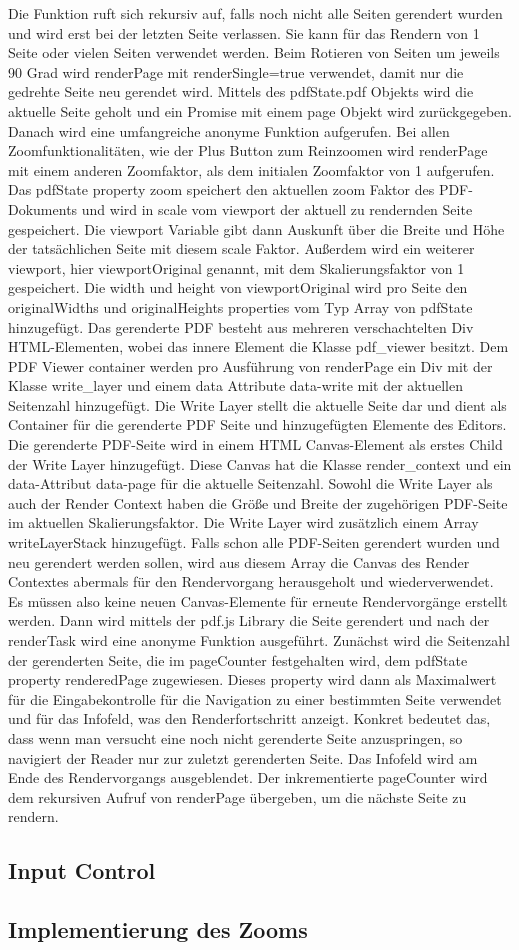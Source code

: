 Die Funktion ruft sich rekursiv auf, falls noch nicht alle Seiten gerendert wurden und wird erst bei der letzten Seite verlassen. Sie kann für das Rendern von 1 Seite oder vielen Seiten verwendet werden. Beim Rotieren von Seiten um jeweils 90 Grad wird renderPage mit renderSingle=true verwendet, damit nur die gedrehte Seite neu gerendet wird. Mittels des pdfState.pdf Objekts wird die aktuelle Seite geholt und ein Promise mit einem page Objekt wird zurückgegeben. Danach wird eine umfangreiche anonyme Funktion aufgerufen. Bei allen Zoomfunktionalitäten, wie der Plus Button zum Reinzoomen wird renderPage mit einem anderen Zoomfaktor, als dem initialen Zoomfaktor von 1 aufgerufen. Das pdfState property zoom speichert den aktuellen zoom Faktor des PDF-Dokuments und wird in scale vom viewport der aktuell zu rendernden Seite gespeichert. Die viewport Variable gibt dann Auskunft über die Breite und Höhe der tatsächlichen Seite mit diesem scale Faktor. Außerdem wird ein weiterer viewport, hier viewportOriginal genannt, mit dem Skalierungsfaktor von 1 gespeichert. Die width und height von viewportOriginal wird pro Seite den originalWidths und originalHeights properties vom Typ Array von pdfState hinzugefügt. Das gerenderte PDF besteht aus mehreren verschachtelten Div HTML-Elementen, wobei das innere Element die Klasse pdf\_viewer besitzt. Dem PDF Viewer container werden pro Ausführung von renderPage ein Div mit der Klasse write\_layer und einem data Attribute data-write mit der aktuellen Seitenzahl hinzugefügt. Die Write Layer stellt die aktuelle Seite dar und dient als Container für die gerenderte PDF Seite und hinzugefügten Elemente des Editors. Die gerenderte PDF-Seite wird in einem HTML Canvas-Element als erstes Child der Write Layer hinzugefügt. Diese Canvas hat die Klasse render\_context und ein data-Attribut data-page für die aktuelle Seitenzahl. Sowohl die Write Layer als auch der Render Context haben die Größe und Breite der zugehörigen PDF-Seite im aktuellen Skalierungsfaktor. Die Write Layer wird zusätzlich einem Array writeLayerStack hinzugefügt. Falls schon alle PDF-Seiten gerendert wurden und neu gerendert werden sollen, wird aus diesem Array die Canvas des Render Contextes abermals für den Rendervorgang herausgeholt und wiederverwendet. Es müssen also keine neuen Canvas-Elemente für erneute Rendervorgänge erstellt werden. Dann wird mittels der pdf.js Library die Seite gerendert und nach der renderTask wird eine anonyme Funktion ausgeführt. Zunächst wird die Seitenzahl der gerenderten Seite, die im pageCounter festgehalten wird, dem pdfState property renderedPage zugewiesen. Dieses property wird dann als Maximalwert für die Eingabekontrolle für die Navigation zu einer bestimmten Seite verwendet und für das Infofeld, was den Renderfortschritt anzeigt. Konkret bedeutet das, dass wenn man versucht eine noch nicht gerenderte Seite anzuspringen, so navigiert der Reader nur zur zuletzt gerenderten Seite. Das Infofeld wird am Ende des Rendervorgangs ausgeblendet. Der inkrementierte pageCounter wird dem rekursiven Aufruf von renderPage übergeben, um die nächste Seite zu rendern. 

\subsection{Input Control}

\subsection{Implementierung des Zooms}

